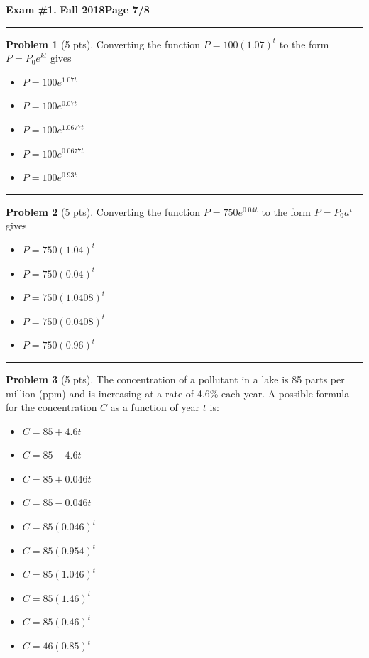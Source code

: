 \documentclass[12pt]{article}
\makeatletter
\theoremstyle{definition}
\newtheorem{problem}{Problem}
\newcommand*{\radiobutton}{%
  \@ifstar{\@radiobutton0}{\@radiobutton1}%
}
\newcommand*{\@radiobutton}[1]{%
  \begin{tikzpicture}
    \pgfmathsetlengthmacro\radius{height("X")/2}
    \draw[radius=\radius] circle;
    \ifcase#1 \fill[radius=.6*\radius] circle;\fi
  \end{tikzpicture}%
}
\makeatother
\begin{document}
\newpage 


\hfill{\large\bf Exam \#1.}\hfill{\large\bf
  Fall 2018}\hfill{\large\bf Page 7/8}\hrule

\bigskip
\begin{problem}[5 pts]
Converting the function $P = 100 (1.07)^t$ to the form $P = P_0e^{kt}$ gives
\begin{itemize}
\item[\radiobutton] $P = 100e^{1.07t}$
\item[\radiobutton] $P = 100 e^{0.07t}$
\item[\radiobutton] $P = 100 e^{1.0677t}$
\item[\radiobutton] $P = 100 e^{0.0677t}$
\item[\radiobutton] $P = 100 e^{0.93t}$
\end{itemize}
\end{problem}

\hrule


\begin{problem}[5 pts]
Converting the function $P = 750e^{0.04t}$ to the form $P = P_0a^t$ gives
\begin{itemize}
\item[\radiobutton] $P = 750 (1.04)^t$
\item[\radiobutton] $P = 750 (0.04)^t$
\item[\radiobutton] $P = 750 (1.0408)^t$
\item[\radiobutton] $P = 750 (0.0408)^t$
\item[\radiobutton] $P = 750 (0.96)^t$
\end{itemize}
\end{problem}
\hrule

\begin{problem}[5 pts]
The concentration of a pollutant in a lake is 85 parts per million (ppm) and is increasing at a rate of 4.6\% each year. A possible formula for the concentration $C$ as a function of year $t$ is:
\begin{itemize}
\item[\radiobutton] $C = 85 + 4.6t$
\item[\radiobutton] $C = 85 - 4.6t$
\item[\radiobutton] $C = 85 + 0.046t$
\item[\radiobutton] $C = 85 - 0.046t$
\item[\radiobutton] $C = 85(0.046)^t$
\item[\radiobutton] $C = 85(0.954)^t$
\item[\radiobutton] $C = 85(1.046)^t$
\item[\radiobutton] $C = 85(1.46)^t$
\item[\radiobutton] $C = 85(0.46)^t$
\item[\radiobutton] $C = 46(0.85)^t$
\end{itemize}
\end{problem}
\newpage
\end{document}
